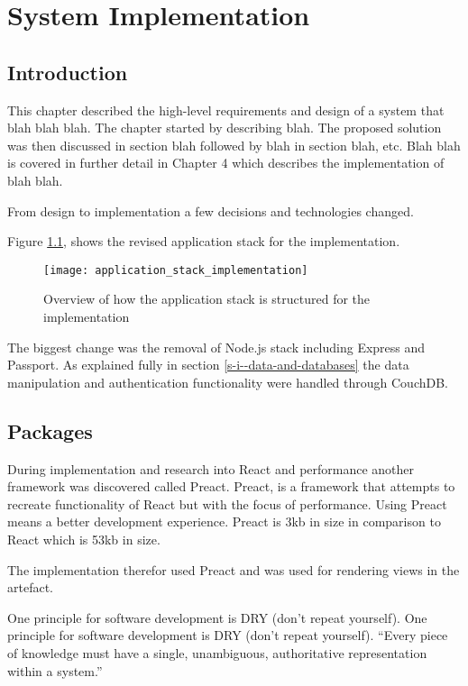 \chapter{System Implementation} \label{s-i}

\section{Introduction} \label{s-i--introduction}

This chapter described the high-level requirements and design of a system that blah blah blah.  The chapter started by describing blah.  The proposed solution was then discussed in section blah followed by blah in section blah, etc.
Blah blah is covered in further detail in Chapter 4 which describes the implementation of blah blah.

From design to implementation a few decisions and technologies changed.

Figure \ref{figure-application-stack-implementation}, shows the revised application stack for the implementation.

\begin{figure}[H]
  \centering
    \texttt{[image: application\_stack\_implementation]}
  \caption{Overview of how the application stack is structured for the implementation}
  \label{figure-application-stack-implementation}
\end{figure}

The biggest change was the removal of Node.js stack including Express and Passport. As explained fully in section \ref{s-i--data-and-databases} the data manipulation and authentication functionality were handled through CouchDB.

\section{Packages} \label{s-i--packages}

During implementation and research into React and performance another framework was discovered called Preact. Preact, is a framework that attempts to recreate functionality of React but with the focus of performance. Using Preact means a better development experience. \cite{preact} Preact is 3kb in size in comparison to React which is 53kb in size.

The implementation therefor used Preact and was used for rendering views in the artefact.

One principle for software development is DRY (don't repeat yourself). One principle for software development is DRY (don't repeat yourself). ``Every piece of knowledge must have a single, unambiguous, authoritative representation within a system.'' \cite{DRY}


